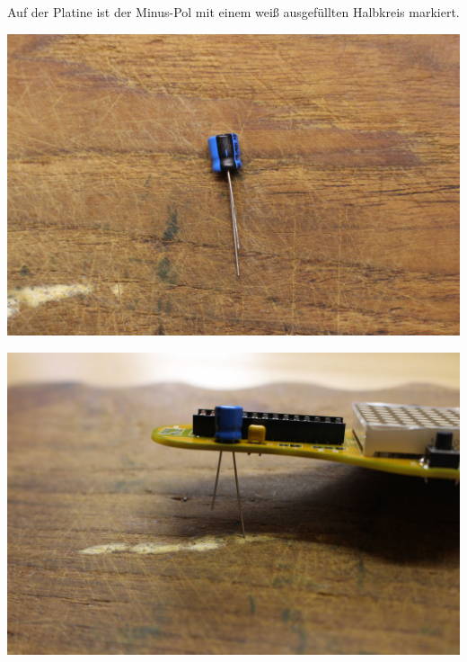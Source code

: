 \documentclass{article}
\begin{document}
Auf der Platine ist der Minus-Pol mit einem weiß ausgefüllten Halbkreis markiert.

\vspace{1cm}

\begin{minipage}[b]{0.5\textwidth}
	\includegraphics[width=\textwidth]{Bilder/IMG_5593.JPG}
\end{minipage}
\begin{minipage}[b]{0.5\textwidth}
	\includegraphics[width=\textwidth]{Bilder/IMG_5594.JPG}
\end{minipage}

\vspace{0.5cm}
\end{document}
